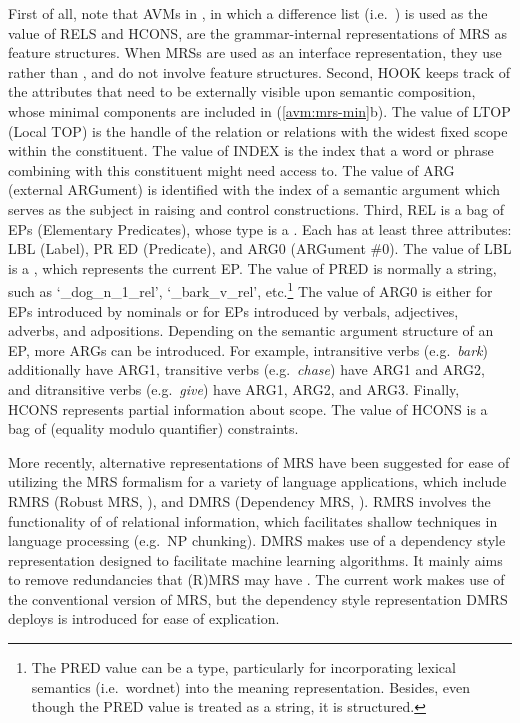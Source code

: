 \noindent First of all, note that AVMs in , in
which a difference list (i.e.\ ) is used as the value
of RELS and HCONS, are the grammar-internal representations of MRS as
feature structures.  When MRSs are used as an interface
representation, they use  rather than , and
do not involve feature structures. Second, HOOK keeps track of the
attributes that need to be externally visible upon semantic
composition, whose minimal components are included in
(\ref{avm:mrs-min}b). The value of LTOP (Local TOP) is the handle of
the relation or relations with the widest fixed scope within the
constituent. The value of INDEX is the index that a word or phrase
combining with this constituent might need access to. The value of ARG
(external ARGument) is identified with the index of a semantic
argument which serves as the subject in raising and control
constructions.
Third, REL is a bag of EPs (Elementary Predicates),
whose type is a . Each  has at least three
attributes: LBL (Label), PR ED (Predicate), and ARG0 (ARGument
\#0). The value of LBL is a , which represents the current
EP. The value of PRED is normally a string, such as
`\_dog\_n\_1\_rel', `\_bark\_v\_rel', etc.\footnote{The PRED value can
  be a type, particularly for incorporating lexical semantics
  (i.e.\ wordnet) into the meaning representation. Besides, even
  though the PRED value is treated as a string, it is structured.}
The value of ARG0 is either  for EPs introduced by
nominals or  for EPs introduced by verbals, adjectives,
adverbs, and adpositions.  Depending on the semantic argument
structure of an EP, more ARGs can be introduced. For example,
intransitive verbs (e.g.\ \textit{bark}) additionally have ARG1,
transitive verbs (e.g.\ \textit{chase}) have ARG1 and ARG2, and
ditransitive verbs (e.g.\ \textit{give}) have ARG1, ARG2, and
ARG3. Finally, HCONS represents partial information about scope.  The
value of HCONS is a bag of  (equality modulo quantifier)
constraints.


More recently, alternative representations of MRS have been suggested
for ease of utilizing the MRS formalism for a variety of language
applications, which include RMRS (Robust MRS, \citealt{copestake:07}),
and DMRS (Dependency MRS, \citealt{copestake:09}).  RMRS involves the
functionality of  of relational information,
which facilitates shallow techniques in language processing (e.g.\ NP
chunking).  DMRS makes use of a dependency style representation
designed to facilitate machine learning algorithms. It mainly aims to
remove redundancies that (R)MRS may have \citep{eveleigh:10}.  The
current work makes use of the conventional version of MRS, but the
dependency style representation DMRS deploys is introduced for ease of
explication.



